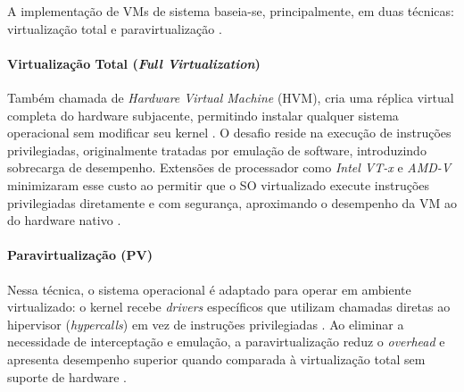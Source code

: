 A implementação de VMs de sistema baseia-se, principalmente, em duas técnicas: virtualização total e paravirtualização \cite{carissimi2008}.

\paragraph{Virtualização Total (\textit{Full Virtualization})} Também chamada de \textit{Hardware Virtual Machine} (HVM), cria uma réplica virtual completa do hardware subjacente, permitindo instalar qualquer sistema operacional sem modificar seu kernel \cite{carissimi2008}. O desafio reside na execução de instruções privilegiadas, originalmente tratadas por emulação de software, introduzindo sobrecarga de desempenho. Extensões de processador como \textit{Intel VT-x} e \textit{AMD-V} minimizaram esse custo ao permitir que o SO virtualizado execute instruções privilegiadas diretamente e com segurança, aproximando o desempenho da VM ao do hardware nativo \cite{carissimi2008, chawla2025}.

\paragraph{Paravirtualização (PV)} Nessa técnica, o sistema operacional é adaptado para operar em ambiente virtualizado: o kernel recebe \textit{drivers} específicos que utilizam chamadas diretas ao hipervisor (\textit{hypercalls}) em vez de instruções privilegiadas \cite{carissimi2008}. Ao eliminar a necessidade de interceptação e emulação, a paravirtualização reduz o \textit{overhead} e apresenta desempenho superior quando comparada à virtualização total sem suporte de hardware \cite{carissimi2008}.

